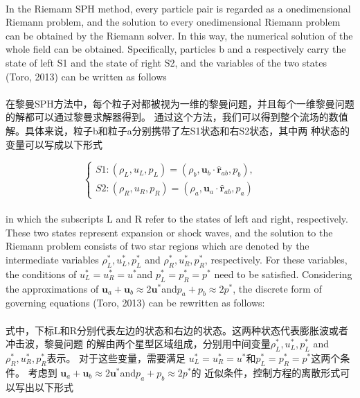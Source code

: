 \documentclass[UTF8]{ctexart}
\begin{document}
\paragraph{\quad}In the Riemann SPH method, every particle pair is regarded as a onedimensional 
                Riemann problem, and the solution to every onedimensional Riemann problem can 
                be obtained by the Riemann solver. In this way, the numerical solution of the whole 
                field can be obtained. Specifically, particles b and a respectively carry the state 
                of left S1 and the state of right S2, and the variables of the two states (Toro, 2013) 
                can be written as follows
\paragraph{\quad}在黎曼SPH方法中，每个粒子对都被视为一维的黎曼问题，并且每个一维黎曼问题的解都可以通过黎曼求解器得到。
                通过这个方法，我们可以得到整个流场的数值解。具体来说，粒子b和粒子a分别携带了左S1状态和右S2状态，其中两
                种状态的变量可以写成以下形式

\begin{equation}
   \begin{cases} S1:(\rho_L,u_L,p_L)=(\rho_b,\mathbf{u}_b\cdot\hat{\mathbf{r}}_{ab},p_b), \\
   S2:(\rho_R,u_R,p_R)=(\rho_a,\mathbf{u}_a\cdot\hat{\mathbf{r}}_{ab},p_a) \end{cases} \qquad
\end{equation}

\paragraph{\quad}in which the subscripts L and R refer to the states of left and right, 
                respectively. These two states represent expansion or shock waves, and 
                the solution to the Riemann problem consists of two star regions which 
                are denoted by the intermediate variables $\rho^*_L, u^*_L, p^*_L$ and $\rho^*_R, u^*_R, p^*_R$, 
                respectively. For these variables, the conditions of $u^*_L = u^*_R = u^* $and $p^*_L = p^*_R = p^* $
                need to be satisfied. Considering the approximations of $\mathbf{u}_a + \mathbf{u}_b \approx 2\mathbf{u}^* $and$p_a + p_b \approx 2p^*$, 
                the discrete form of governing equations (Toro, 2013) can be rewritten as follows:
\paragraph{\quad}式中，下标L和R分别代表左边的状态和右边的状态。这两种状态代表膨胀波或者冲击波，黎曼问题
                的解由两个星型区域组成，分别用中间变量$\rho^*_L, u^*_L, p^*_L$ and $\rho^*_R, u^*_R, p^*_R$表示。
                对于这些变量，需要满足 $u^*_L = u^*_R = u^* $和$p^*_L = p^*_R = p^* $这两个条件。
                考虑到 $\mathbf{u}_a + \mathbf{u}_b \approx 2\mathbf{u}^* $and$p_a + p_b \approx 2p^*$的
                近似条件，控制方程的离散形式可以写出以下形式
\end{document}
